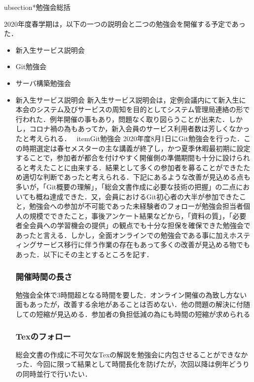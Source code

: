 ubsection*{勉強会総括}


2020年度春学期は，以下の一つの説明会と二つの勉強会を開催する予定であった．
\begin{itemize}
	\item 新入生サービス説明会
	\item Git勉強会
	\item サーバ構築勉強会
\end{itemize}

\begin{itemize}

	\item{新入生サービス説明会}
新入生サービス説明会は，定例会議内にて新入生に本会のシステム及びサービスの周知を目的としてシステム管理局連絡の形で行われた．例年開催の事もあり，問題なく取り図らうことが出来た．しかし，コロナ禍の為もあってか，新入会員のサービス利用者数は芳しくなかったと考えられる．
	\ item{Git勉強会}
2020年度8月1日にGit勉強会を行った．この時期選定は春セメスターの主な講義が終了し，かつ夏季休暇最初期に設定することで，参加者が都合を付けやすく開催側の準備期間も十分に設けられると考えたことに由来する．結果として多くの参加者を募ることができたため適切な判断であったと考えられる．下記にあるような改善が見込める点も多いが，「Git概要の理解」，「総会文書作成に必要な技術の把握」の二点においても概ね達成できた．又，会員におけるGit初心者の大半が参加できたこと，勉強会への参加が不可能であった未経験者のフォローが勉強会担当者個人の規模でできたこと，事後アンケート結果などから，「資料の質」，「必要者全会員への学習機会の提供」の観点でも十分な担保を確保できた勉強会であったと言える．しかし，全面オンラインでの勉強会である事に加えホスティングサービス移行に伴う作業の存在もあって多くの改善が見込める物でもあった．以下にその主とするところを記す．
\subsubsection*{開催時間の長さ}
勉強会全体で3時間超となる時間を要した．オンライン開催の為致し方ない面もあったが，改善する余地があることは否めない．他の問題の解決に付随しての短縮が見込める．参加者の負担低減の為にも時間の短縮が求められる
\subsubsection*{Texのフォロー}
総会文書の作成に不可欠なTexの解説を勉強会に内包させることができなかった．今回に限って結果として時間長化を防げたが，次回以降は例年どうりの同時並行で行いたい．

\end{itemize}
